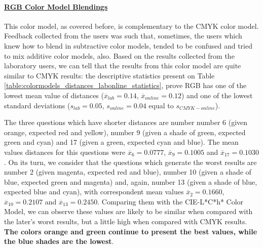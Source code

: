 \paragraph{\ul{RGB Color Model Blendings}}
\label{subsubsec:rgbcolormodel}
%
This color model, as covered before, is complementary to the CMYK color model. Feedback collected from the users was such that, sometimes, the users which knew how to blend in subtractive color models,
tended to be confused and tried to mix additive color models, also. Based on the results collected from the laboratory users, we can tell that the results from this color model are quite similar to CMYK results: the descriptive statistics present
on Table \ref{table:colormodels_distances_labonline_statistics}, prove RGB has one of the lowest mean value of distances ($\overline{x}_{lab} = 0.14$, $\overline{x}_{online} = 0.12$) and one of
the lowest standard deviations ($s_{lab} = 0.05$, $s_{online} = 0.04$ equal to $s_{CMYK-online}$). \par
%
The three questions which have shorter distances are number number 6 (given orange, expected red and yellow), number 9 (given a shade of green, expected green and cyan) and 17 (given a green, expected cyan and blue). The mean values
distances for this questions were $\overline{x}_{6} = 0.0777$, $\overline{x}_{9} = 0.1005$ and $\overline{x}_{17} = 0.1030$.
On its turn, we consider that the questions which generate the worst results are number 2 (given magenta, expected red and blue), number 10 (given a shade of blue, expected green and magenta) and, again, number 13 (given a shade of blue,
expected blue and cyan), with correspondent mean values $\overline{x}_{2} = 0.1660$, $\overline{x}_{10} = 0.2107$ and $\overline{x}_{13} = 0.2450$.
Comparing them with the CIE-L*C*h* Color Model, we can observe these values are likely to be similar when compared with the later's worst results, but a little high when compared with CMYK results. \textbf{The colors orange and green continue to
present the best values, while the blue shades are the lowest}. \par
%

